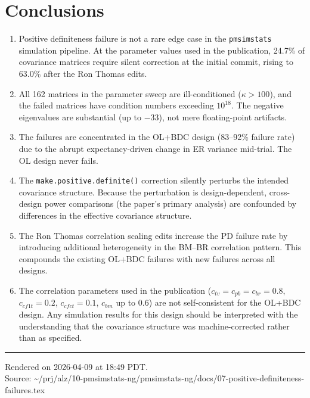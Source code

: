 \documentclass[11pt]{article}
\begin{document}
\section{Conclusions}

\begin{enumerate}
\item Positive definiteness failure is not a rare edge case in
  the \texttt{pmsimstats} simulation pipeline. At the parameter
  values used in the publication, 24.7\% of covariance matrices
  require silent correction at the initial commit, rising to
  63.0\% after the Ron Thomas edits.

\item All 162 matrices in the parameter sweep are
  ill-conditioned ($\kappa > 100$), and the failed matrices
  have condition numbers exceeding $10^{18}$. The negative
  eigenvalues are substantial (up to $-33$), not mere
  floating-point artifacts.

\item The failures are concentrated in the OL+BDC design
  (83--92\% failure rate) due to the abrupt expectancy-driven
  change in ER variance mid-trial. The OL design never fails.

\item The \texttt{make.positive.definite()} correction silently
  perturbs the intended covariance structure. Because the
  perturbation is design-dependent, cross-design power
  comparisons (the paper's primary analysis) are confounded
  by differences in the effective covariance structure.

\item The Ron Thomas correlation scaling edits increase the
  PD failure rate by introducing additional heterogeneity in
  the BM--BR correlation pattern. This compounds the existing
  OL+BDC failures with new failures across all designs.

\item The correlation parameters used in the publication
  ($c_{tv} = c_{pb} = c_{br} = 0.8$, $c_{cf1t} = 0.2$,
  $c_{cfct} = 0.1$, $c_{bm}$ up to 0.6) are not
  self-consistent for the OL+BDC design. Any simulation
  results for this design should be interpreted with the
  understanding that the covariance structure was
  machine-corrected rather than as specified.
\end{enumerate}

\vfill
\noindent\rule{\textwidth}{0.4pt}
{\footnotesize
Rendered on 2026-04-09 at 18:49 PDT.\\
Source: \textasciitilde/prj/alz/10-pmsimstats-ng/pmsimstats-ng/docs/07-positive-definiteness-failures.tex}
\end{document}
